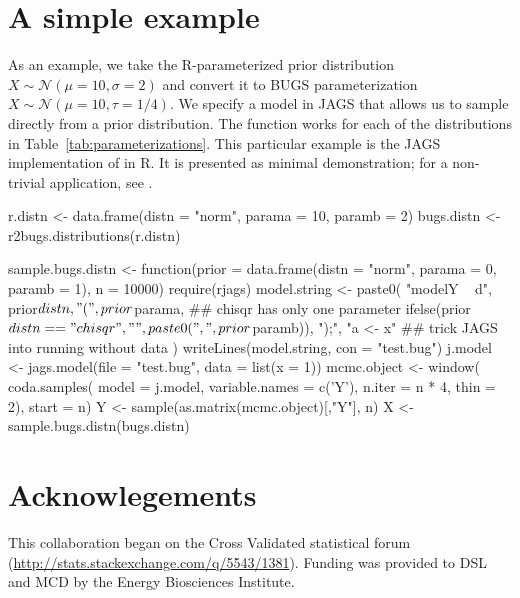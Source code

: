 \section{A simple example}

As an example, we take the R-parameterized prior distribution $X \sim \mathcal{N}(\mu=10,\sigma=2)$ and 
convert it to BUGS  parameterization $X \sim \mathcal{N}(\mu=10,\tau=1/4)$.
We specify a model in JAGS that allows us to sample directly from a prior distribution.  
The function works for each of the distributions in Table~\ref{tab:parameterizations}. 
This particular example is the JAGS implementation of  in R. 
It is presented as minimal demonstration;
for a non-trivial application, see \cite{lebauer2012ffb}. 

\begin{example}

r.distn <- data.frame(distn = "norm", parama = 10, paramb = 2)
bugs.distn <- r2bugs.distributions(r.distn)
   
sample.bugs.distn <- function(prior = data.frame(distn = "norm", parama = 0, 
                                paramb = 1), n = 10000) {
  require(rjags)
  model.string <- paste0(
    "model{Y ~ d", prior$distn, 
    "(", prior$parama, 
    ## chisqr has only one parameter
    ifelse(prior$distn == "chisqr", "", paste0(", ", prior$paramb)), ");",
    "a <- x}"   ## trick JAGS into running without data 
  )    
  writeLines(model.string, con = "test.bug")
  j.model  <- jags.model(file = "test.bug", data = list(x = 1))
  mcmc.object <- window(
    coda.samples(
      model = j.model, variable.names = c('Y'), 
      n.iter = n * 4, thin = 2),
    start = n)
  Y <- sample(as.matrix(mcmc.object)[,"Y"], n)
}
X <- sample.bugs.distn(bugs.distn)
\end{example}

\section{Acknowlegements}

This collaboration began on the Cross Validated statistical forum (\url{http://stats.stackexchange.com/q/5543/1381}). Funding was provided to DSL and MCD by the Energy Biosciences Institute.



